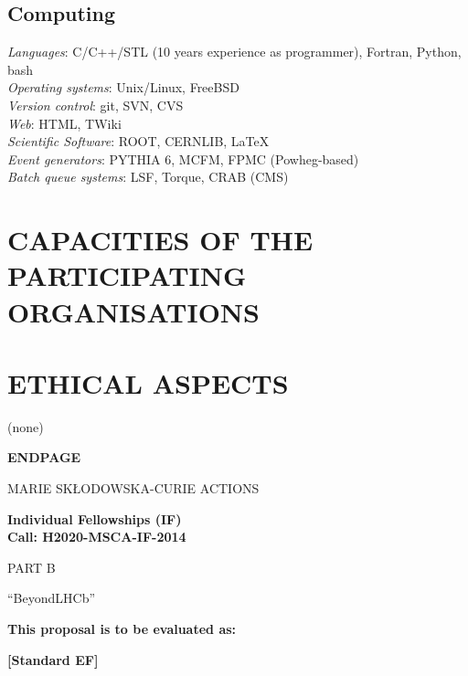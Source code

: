 \documentclass[a4paper,11pt]{article}
\newcommand{\acronym}{{\sc BeyondLHCb}\xspace} %
\begin{document}
\subsection*{Computing}
\textit{Languages}: C/C++/STL (10 years experience as programmer), Fortran, Python, bash\\
\textit{Operating systems}: Unix/Linux, FreeBSD\\
\textit{Version control}: git, SVN, CVS\\
\textit{Web}: HTML, TWiki\\
\textit{Scientific Software}: ROOT, CERNLIB, \LaTeX\\
\textit{Event generators}: PYTHIA 6, MCFM, FPMC (Powheg-based)\\
\textit{Batch queue systems}: LSF, Torque, CRAB (CMS)



\newpage
\section{CAPACITIES OF THE PARTICIPATING ORGANISATIONS}
\label{sec:capacities}
\vspace{\baselineskip}

\vspace{\baselineskip}


\section{ETHICAL ASPECTS}

(none)


\newpage
\vspace{15mm}
\begin{center}


        \Large{
      
     
        \textbf{ENDPAGE}
  
          \vspace{15mm}
          MARIE SKŁODOWSKA-CURIE ACTIONS\\
          \vspace{1cm}
          
          \textbf{Individual Fellowships (IF)}\\
          \textbf{Call: H2020-MSCA-IF-2014}
          \vspace{2cm}                   

          PART B
          \vspace{2.5cm}

          ``\acronym''
          \vspace{2cm}

          \textbf{This proposal is to be evaluated as:}
          \vspace{.5cm}

          \textbf{[Standard EF]}
        }

  \end{center}
\vspace{1cm}
\end{document}
